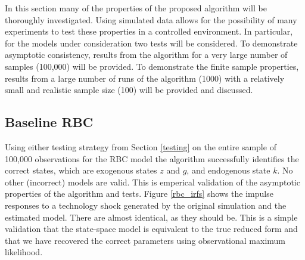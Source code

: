 \documentclass{article}
\begin{document}
In this section many of the properties of the proposed algorithm will be thoroughly investigated. Using simulated data allows for the possibility of many experiments to test these properties in a controlled environment. In particular, for the models under consideration two tests will be considered. To demonstrate asymptotic consistency, results from the algorithm for a very large number of samples (100,000) will be provided. To demonstrate the finite sample properties, results from a large number of runs of the algorithm (1000) with a relatively small and realistic sample size (100) will be provided and discussed.

\subsection{Baseline RBC}

Using either testing strategy from Section \ref{testing} on the entire sample of 100,000 observations for the RBC model the algorithm successfully identifies the correct states, which are exogenous states $z$ and $g$, and endogenous state $k$. No other (incorrect) models are valid. This is emperical validation of the asymptotic properties of the algorithm and tests. Figure \ref{rbc_irfs} shows the impulse responses to a technology shock generated by the original simulation and the estimated model. There are almost identical, as they should be. This is a simple validation that the state-space model is equivalent to the true reduced form and that we have recovered the correct parameters using observational maximum likelihood.
\end{document}

